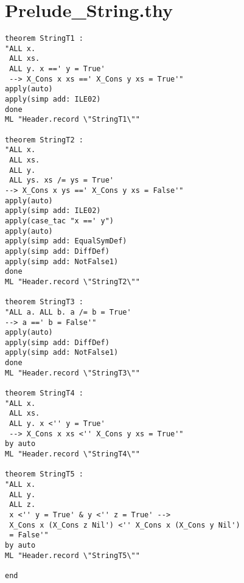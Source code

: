 \section{Prelude\_String.thy}
\label{appendix:strictProofs:String}
\begin{multicols}{2}
\tiny
\begin{Verbatim}
theorem StringT1 :
"ALL x.
 ALL xs.
 ALL y. x ==' y = True'
 --> X_Cons x xs ==' X_Cons y xs = True'"
apply(auto)
apply(simp add: ILE02)
done
ML "Header.record \"StringT1\""

theorem StringT2 :
"ALL x.
 ALL xs.
 ALL y.
 ALL ys. xs /= ys = True' 
--> X_Cons x ys ==' X_Cons y xs = False'"
apply(auto)
apply(simp add: ILE02)
apply(case_tac "x ==' y")
apply(auto)
apply(simp add: EqualSymDef)
apply(simp add: DiffDef)
apply(simp add: NotFalse1)
done
ML "Header.record \"StringT2\""

theorem StringT3 :
"ALL a. ALL b. a /= b = True' 
--> a ==' b = False'"
apply(auto)
apply(simp add: DiffDef)
apply(simp add: NotFalse1)
done
ML "Header.record \"StringT3\""

theorem StringT4 :
"ALL x.
 ALL xs.
 ALL y. x <'' y = True'
 --> X_Cons x xs <'' X_Cons y xs = True'"
by auto
ML "Header.record \"StringT4\""

theorem StringT5 :
"ALL x.
 ALL y.
 ALL z.
 x <'' y = True' & y <'' z = True' -->
 X_Cons x (X_Cons z Nil') <'' X_Cons x (X_Cons y Nil')
 = False'"
by auto
ML "Header.record \"StringT5\""

end
\end{Verbatim}
\end{multicols}

